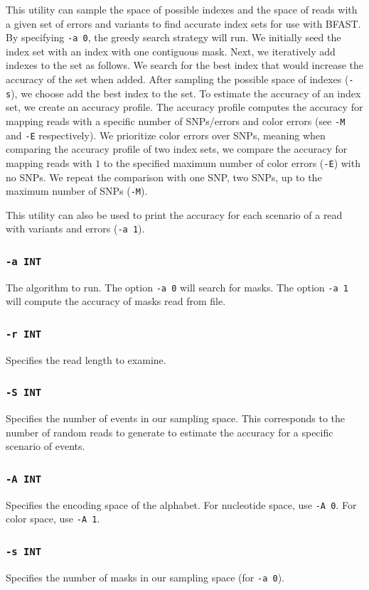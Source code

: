 \documentclass[a4paper,12pt]{book}
\newcommand{\TT}[1]{{\tt #1}} %
\begin{document}
This utility can sample the space of possible indexes and the space of reads with a given set of errors and variants to find accurate index sets for use with BFAST.
By specifying \TT{-a 0}, the greedy search strategy will run.
We initially seed the index set with an index with one contiguous mask.
Next, we iteratively add indexes to the set as follows.
We search for the best index that would increase the accuracy of the set when added.
After sampling the possible space of indexes (\TT{-s}), we choose add the best index to the set.
To estimate the accuracy of an index set, we create an accuracy profile.
The accuracy profile computes the accuracy for mapping reads with a specific number of SNPs/errors and color errors (see \TT{-M} and \TT{-E} respectively).
We prioritize color errors over SNPs, meaning when comparing the accuracy profile of two index sets, we compare the accuracy for mapping reads with $1$ to the specified maximum number of color errors (\TT{-E}) with no SNPs.
We repeat the comparison with one SNP, two SNPs, up to the maximum number of SNPs (\TT{-M}).

This utility can also be used to print the accuracy for each scenario of a read with variants and errors (\TT{-a 1}). 

\subsubsection{\TT{-a INT}}
The algorithm to run.
The option \TT{-a 0} will search for masks.
The option \TT{-a 1} will compute the accuracy of masks read from file.
\subsubsection{\TT{-r INT}}
Specifies the read length to examine.
\subsubsection{\TT{-S INT}}
Specifies the number of events in our sampling space.
This corresponds to the number of random reads to generate to estimate the accuracy for a specific scenario of events.
\subsubsection{\TT{-A INT}}
Specifies the encoding space of the alphabet.
For nucleotide space, use \TT{-A 0}.
For color space, use \TT{-A 1}.
\subsubsection{\TT{-s INT}}
Specifies the number of masks in our sampling space (for \TT{-a 0}).
\end{document}
